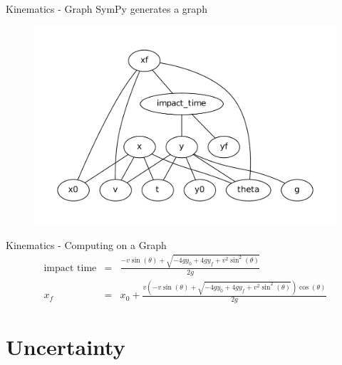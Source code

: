 \documentclass[compress, blue]{beamer}
\begin{document}
\begin{frame}{Kinematics - Graph}
    SymPy generates a graph
    \begin{figure}
        \includegraphics[width=\textwidth]{images/dag.pdf}
    \end{figure}
\end{frame}

\begin{frame}{Kinematics - Computing on a Graph}
\begin{eqnarray*}
    \textrm{impact time} & = & \frac{- v \sin{\left(\theta \right)} 
            + \sqrt{- 4 g y_{0} + 4 g y_f + v^{2} 
            \sin^{2}{\left(\theta \right)}}}{2 g}  \\
    x_f & = & x_{0} + \frac{v \left(- v \sin{\left(\theta \right)} 
            + \sqrt{- 4 g y_{0} + 4 g y_f + v^{2} 
            \sin^{2}{\left(\theta \right)}}\right) 
             \cos{\left(\theta \right)}}{2 g}
\end{eqnarray*}
\end{frame}

\section{Uncertainty}
\end{document}
